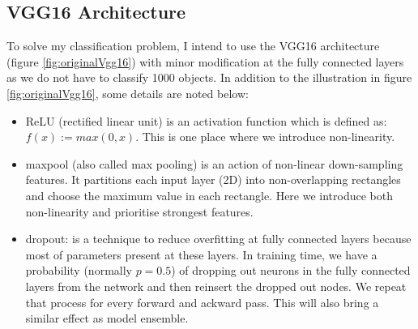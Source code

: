 \subsection{VGG16 Architecture}
To solve my classification problem, I intend to use the VGG16 architecture \cite{DBLP:journals/corr/SimonyanZ14a} (figure \ref{fig:originalVgg16}) with minor modification at the fully connected layers as we do not have to classify 1000 objects. In addition to the illustration in figure \ref{fig:originalVgg16}, some details are noted below:
\begin{itemize}
	\item ReLU (rectified linear unit) is an activation function which is defined as: $f(x) := max(0, x)$. This is one place where we introduce non-linearity.
	\item maxpool (also called max pooling) is an action of non-linear down-sampling features. It partitions each input layer (2D) into non-overlapping rectangles and choose the maximum value in each rectangle. Here we introduce both non-linearity and prioritise strongest features.
	\item dropout: is a technique to reduce overfitting at fully connected layers because most of parameters present at these layers. In training time, we have a probability (normally $p=0.5$) of dropping out neurons in the fully connected layers from the network and then reinsert the dropped out nodes. We repeat that process for every forward and ackward pass. This will also bring a similar effect as model ensemble.
\end{itemize}
